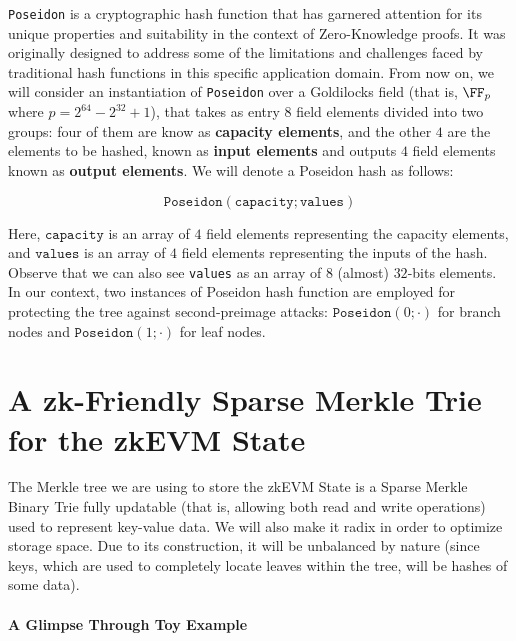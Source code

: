 

\texttt{Poseidon} is a cryptographic hash function that has garnered attention for its unique properties and suitability in the context of Zero-Knowledge proofs. It was originally designed to address some of the limitations and challenges faced by traditional hash functions in this specific application domain. From now on, we will consider an instantiation of \texttt{Poseidon} over a Goldilocks field (that is, $\FF_p$ where $p = 2^{64} - 2^{32} + 1$), that takes as entry $8$ field elements divided into two groups: four of them are know as \textbf{capacity elements}, and the other $4$ are the elements to be hashed, known as \textbf{input elements} and outputs $4$ field elements known as \textbf{output elements}. We will denote a Poseidon hash as follows:

\[
\texttt{Poseidon}(\texttt{capacity};\texttt{values})
\]

Here, $\texttt{capacity}$ is an array of $4$ field elements representing the capacity elements, and $\texttt{values}$ is an array of $4$ field elements representing the inputs of the hash. Observe that we can also see \texttt{values} as an array of $8$ (almost) $32$-bits elements. In our context, two instances of Poseidon hash function are employed for protecting the tree against second-preimage attacks: $\texttt{Poseidon}(0; \cdot)$ for branch nodes and $\texttt{Poseidon}(1; \cdot)$ for leaf nodes.







\section{A zk-Friendly Sparse Merkle Trie for the zkEVM State}

The Merkle tree we are using to store the zkEVM State is a Sparse Merkle Binary Trie fully updatable (that is, allowing both read and write operations)  used to represent key-value data. We will also make it radix in order to optimize storage space. Due to its construction, it will be unbalanced by nature (since keys, which are used to completely locate leaves within the tree, will be hashes of some data).

\paragraph*{A Glimpse Through Toy Example}

